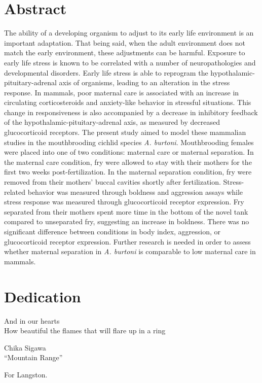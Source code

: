 \documentclass[12pt,twoside]{reedthesis}
\begin{document}
    \tableofcontents
    \listoftables
    \listoffigures

    \chapter*{Abstract}
	The ability of a developing organism to adjust to its early life environment is an
  important adaptation. That being said, when the adult environment does not
  match the early environment, these adjustments can be harmful. Exposure to
  early life stress is known to be correlated with a number of neuropathologies
  and developmental disorders. Early life stress is able to
  reprogram the hypothalamic-pituitary-adrenal axis of organisms, leading to an
  alteration in the stress response. In mammals, poor maternal care is associated
  with an increase in circulating corticosteroids and anxiety-like behavior in stressful situations. This change in
  responsiveness is also accompanied by a decrease in inhibitory feedback of the
  hypothalamic-pituitary-adrenal axis, as measured by decreased glucocorticoid
  receptors. The present study aimed to model these mammalian studies in the
  mouthbrooding cichlid species \textit{A. burtoni}. Mouthbrooding females were
  placed into one of two conditions: maternal care or maternal separation. In
  the maternal care condition, fry were allowed to stay with their mothers for
  the first two weeks post-fertilization. In the maternal separation condition,
  fry were removed from their mothers' buccal cavities shortly after
  fertilization. Stress-related behavior was measured through boldness and
  aggression assays while stress response was measured through glucocorticoid
  receptor expression. Fry separated from their mothers spent more time in the
  bottom of the novel tank compared to unseparated fry, suggesting an increase
  in boldness. There was no significant difference between conditions in
  body index, aggression, or glucocorticoid receptor expression. Further research
  is needed in order to assess whether maternal separation in \textit{A.
    burtoni} is comparable to low maternal care in mammals. 
    
	\chapter*{Dedication}
  \epigraph{And in our hearts\\ How beautiful the flames that will flare up in a
    ring}{Chika Sigawa \\ ``Mountain Range''}
For Langston.
  \mainmatter %
  \pagestyle{fancyplain} %
\end{document}
